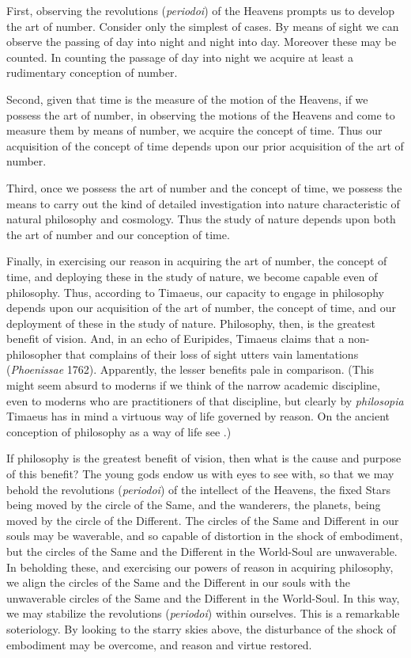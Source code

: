 First, observing the revolutions (\emph{periodoi}) of the Heavens prompts us to develop the art of number. Consider only the simplest of cases. By means of sight we can observe the passing of day into night and night into day. Moreover these may be counted. In counting the passage of day into night we acquire at least a rudimentary conception of number.

Second, given that time is the measure of the motion of the Heavens, if we possess the art of number, in observing the motions of the Heavens and come to measure them by means of number, we acquire the concept of time. Thus our acquisition of the concept of time depends upon our prior acquisition of the art of number.

Third, once we possess the art of number and the concept of time, we possess the means to carry out the kind of detailed investigation into nature characteristic of natural philosophy and cosmology. Thus the study of nature depends upon both the art of number and our conception of time.

Finally, in exercising our reason in acquiring the art of number, the concept of time, and deploying these in the study of nature, we become capable even of philosophy. Thus, according to Timaeus, our capacity to engage in philosophy depends upon our acquisition of the art of number, the concept of time, and our deployment of these in the study of nature. Philosophy, then, is the greatest benefit of vision. And, in an echo of Euripides, Timaeus claims that a non-philosopher that complains of their loss of sight utters vain lamentations (\emph{Phoenissae} 1762). Apparently, the lesser benefits pale in comparison. (This might seem absurd to moderns if we think of the narrow academic discipline, even to moderns who are practitioners of that discipline, but clearly by \emph{philosopia} Timaeus has in mind a virtuous way of life governed by reason. On the ancient conception of philosophy as a way of life see \citealt{Cooper:2012aa}.)

If philosophy is the greatest benefit of vision, then what is the cause and purpose of this benefit? The young gods endow us with eyes to see with, so that we may behold the revolutions (\emph{periodoi}) of the intellect of the Heavens, the fixed Stars being moved by the circle of the Same, and the wanderers, the planets, being moved by the circle of the Different. The circles of the Same and Different in our souls may be waverable, and so capable of distortion in the shock of embodiment, but the circles of the Same and the Different in the World-Soul are unwaverable. In beholding these, and exercising our powers of reason in acquiring philosophy, we align the circles of the Same and the Different in our souls with the unwaverable circles of the Same and the Different in the World-Soul. In this way, we may stabilize the revolutions (\emph{periodoi}) within ourselves. This is a remarkable soteriology. By looking to the starry skies above, the disturbance of the shock of embodiment may be overcome, and reason and virtue restored.

